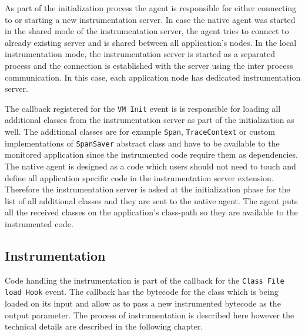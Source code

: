 As part of the initialization process the agent is responsible for either connecting to or starting a new instrumentation server. In case the native agent was started in the shared mode of the instrumentation server, the agent tries to connect to already existing server and is shared between all application's nodes. In the local instrumentation mode, the instrumentation server is started as a separated process and the connection is established with the server using the inter process communication. In this case, each application node has dedicated instrumentation server.

The callback registered for the \texttt{VM Init} event is is responsible for loading all additional classes from the instrumentation server as part of the initialization as well. The additional classes are for example \texttt{Span}, \texttt{TraceContext} or custom implementations of \texttt{SpanSaver} abstract class and have to be available to the monitored application since the instrumented code require them as dependencies. The native agent is designed as a code which users should not need to touch and define all application specific code in the instrumentation server extension. Therefore the instrumentation server is asked at the initialization phase for the list of all additional classes and they are sent to the native agent. The agent puts all the received classes on the application's class-path so they are available to the instrumented code.

\subsection{Instrumentation}
Code handling the instrumentation is part of the callback for the \texttt{Class File load Hook} event. The callback has the bytecode for the class which is being loaded on its input and allow as to pass a new instrumented bytecode as the output parameter. The process of instrumentation is described here however the technical details are described in the following chapter.

